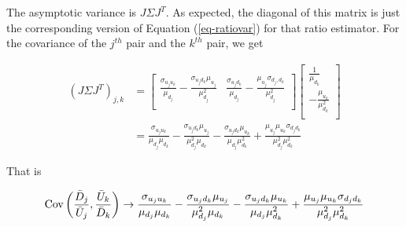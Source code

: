\documentclass{article}
\begin{document}
The asymptotic variance is $J\Sigma J^T$. As expected, the diagonal of this matrix is just the corresponding version of Equation (\ref{eq-ratiovar}) for that ratio estimator. For the covariance of the $j^{th}$ pair and the $k^{th}$ pair, we get

\begin{align*}
(J\Sigma J^T)_{j,k} &= 
    \begin{bmatrix}
  \frac{\sigma_{u_ju_k}}{\mu_{d_j}} - \frac{\sigma_{u_jd_k}\mu_{u_j}}{\mu_{d_j}^2}  & \frac{\sigma_{u_jd_k}}{\mu_{d_j}} - \frac{\mu_{u_j}\sigma_{d_j,d_k}}{\mu_{d_j}^2} \\
\end{bmatrix} \begin{bmatrix}
   \frac{1}{\mu_{d_k}} \\ 
    -\frac{\mu_{u_k}}{\mu_{d_k}^2} \\ 
\end{bmatrix}\\ 
&= \frac{\sigma_{u_ju_k}}{\mu_{d_j}\mu_{d_k}} - \frac{\sigma_{u_jd_k}\mu_{u_j}}{\mu^2_{d_j}\mu_{d_k}} - \frac{\sigma_{u_jd_k}\mu_{u_k}}{\mu_{d_j}\mu_{d_k}^2}  + \frac{\mu_{u_j}\mu_{u_k}\sigma_{d_jd_k}}{\mu_{d_j}^2\mu_{d_k}^2}
\end{align*}

That is 

\begin{equation*}
    \mbox{Cov}\left(\frac{\bar{D}_j}{\bar{U}_j}, \frac{\bar{U}_k}{\bar{D}_k}\right) \rightarrow \frac{\sigma_{u_ju_k}}{\mu_{d_j}\mu_{d_k}} - \frac{\sigma_{u_jd_k}\mu_{u_j}}{\mu^2_{d_j}\mu_{d_k}} - \frac{\sigma_{u_jd_k}\mu_{u_k}}{\mu_{d_j}\mu_{d_k}^2}  + \frac{\mu_{u_j}\mu_{u_k}\sigma_{d_jd_k}}{\mu_{d_j}^2\mu_{d_k}^2}
\end{equation*}
\end{document}
